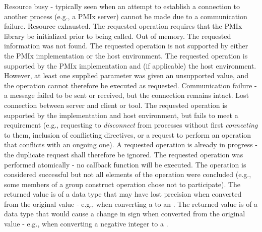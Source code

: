 \begin{constantdesc}
%
Resource busy - typically seen when an attempt to establish a connection
to another process (e.g., a \ac{PMIx} server) cannot be made due to a
communication failure.
%
Resource exhausted.
%
The requested operation requires that the \ac{PMIx} library be initialized prior to being called.
%
Out of memory.
%
The requested information was not found.
%
The requested operation is not supported by either the \ac{PMIx} implementation
or the host environment.
%
The requested operation is supported by the \ac{PMIx} implementation and (if applicable) the host environment. However, at least one supplied parameter was given an unsupported value, and the operation cannot therefore be executed as requested.
%
Communication failure - a message failed to be sent or received, but the
connection remains intact.
%
Lost connection between server and client or tool.
%
The requested operation is supported by the implementation and host environment, but fails to meet a requirement (e.g., requesting to \textit{disconnect} from processes without first \textit{connecting} to them, inclusion of conflicting directives, or a request to perform an operation that conflicts with an ongoing one).
%
A requested operation is already in progress - the duplicate request
shall therefore be ignored.
%
The requested operation was performed atomically - no callback function will be executed.
%
The operation is considered successful but not all elements of the operation were concluded (e.g., some members of a group construct operation chose not to participate).
%
The returned value is of a data type that may have lost precision when converted from the original value - e.g., when converting a  to an .
%
The returned value is of a data type that would cause a change in sign when converted from the original value - e.g., when converting a negative integer to a .
%

\end{constantdesc}


